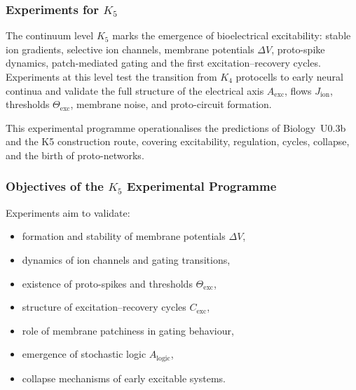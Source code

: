 
\subsubsection{Experiments for \texorpdfstring{$K_5$}{K5}}
\label{sec:experiments-k5}

The continuum level $K_5$ marks the emergence of
bioelectrical excitability: stable ion gradients,
selective ion channels, membrane potentials $\Delta V$,
proto-spike dynamics, patch-mediated gating and the
first excitation--recovery cycles.
Experiments at this level test the transition from $K_4$ protocells
to early neural continua and validate the full structure of
the electrical axis $A_{\mathrm{exc}}$, flows $J_{\mathrm{ion}}$,
thresholds $\Theta_{\mathrm{exc}}$, membrane noise,
and proto-circuit formation.

This experimental programme operationalises the predictions of
Biology~U0.3b and the K5 construction route, covering excitability, regulation,
cycles, collapse, and the birth of proto-networks.



\subsubsection{Objectives of the \texorpdfstring{$K_5$}{K5} Experimental Programme}

Experiments aim to validate:

\begin{itemize}
    \item formation and stability of membrane potentials $\Delta V$,
    \item dynamics of ion channels and gating transitions,
    \item existence of proto-spikes and thresholds $\Theta_{\mathrm{exc}}$,
    \item structure of excitation--recovery cycles $C_{\mathrm{exc}}$,
    \item role of membrane patchiness in gating behaviour,
    \item emergence of stochastic logic $A_{\mathrm{logic}}$,
    \item collapse mechanisms of early excitable systems.
\end{itemize}



